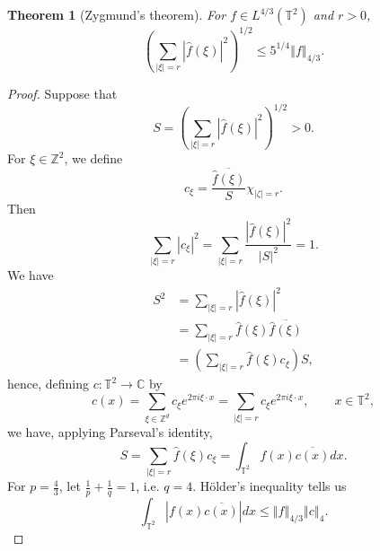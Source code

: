 \documentclass{article}
\newcommand{\norm}[1]{\left\Vert #1 \right\Vert}
\newtheorem{theorem}{Theorem}
\theoremstyle{definition}
\begin{document}
\begin{theorem}[Zygmund's theorem]
For $f \in L^{4/3}(\mathbb{T}^2)$ and $r>0$,
\begin{equation}
\left( \sum_{|\xi|=r} |\hat{f}(\xi)|^2 \right)^{1/2} \leq 5^{1/4} \norm{f}_{4/3}.
\label{zygmund}
\end{equation}
\end{theorem}
\begin{proof}
Suppose that 
\[
S=\left( \sum_{|\xi|=r} |\hat{f}(\xi)|^2 \right)^{1/2} > 0.
\]
For $\xi \in \mathbb{Z}^2$, we define 
\[
c_\xi = \frac{\overline{\hat{f}(\xi)}}{S} \chi_{|\zeta|=r}.
\]
Then
\begin{equation}
\sum_{|\xi|=r} |c_\xi|^2 = \sum_{|\xi|=r}
\frac{|\hat{f}(\xi)|^2}{|S|^2}
=1.
\label{rsum}
\end{equation}
We have
\begin{align*}
S^2&=\sum_{|\xi|=r} |\hat{f}(\xi)|^2\\
&=\sum_{|\xi|=r} \hat{f}(\xi) \overline{\hat{f}(\xi)}\\
&=\left(\sum_{|\xi|=r} \hat{f}(\xi) c_\xi\right) S,
\end{align*}
hence, defining $c:\mathbb{T}^2 \to \mathbb{C}$ by
\[
c(x)=\sum_{\xi \in \mathbb{Z}^d} c_\xi e^{2\pi i\xi\cdot x}=
\sum_{|\xi|=r} c_\xi e^{2\pi i\xi\cdot x}, \qquad x \in \mathbb{T}^2,
\]
we have, applying Parseval's identity,
\[
S=\sum_{|\xi|=r} \hat{f}(\xi) c_\xi
=\int_{\mathbb{T}^2} f(x) \overline{c(x)} dx.
\]
For $p=\frac{4}{3}$, let $\frac{1}{p}+\frac{1}{q}=1$, i.e.
$q=4$. 
H\"older's inequality
tells us
\[
\int_{\mathbb{T}^2} |f(x) \overline{c(x)}| dx 
\leq \norm{f}_{4/3} \norm{c}_4.
\]


\end{proof}
\end{document}
